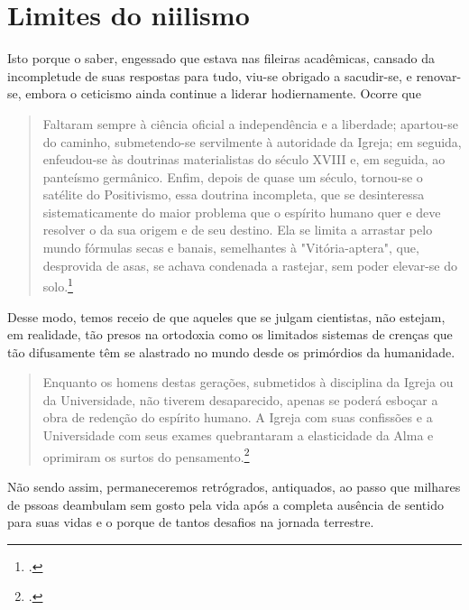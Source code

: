 \lipsum[1-5]


\chapter{Limites do niilismo}


\lipsum[1-5]

Isto porque o saber, engessado que estava nas fileiras acadêmicas, cansado da incompletude de suas respostas para tudo, viu-se obrigado a sacudir-se, e renovar-se, embora o ceticismo ainda continue a liderar hodiernamente. Ocorre que

\begin{quote}
	Faltaram sempre à ciência oficial a independência e a liberdade; apartou-se do caminho, submetendo-se servilmente à autoridade da Igreja; em seguida, enfeudou-se às doutrinas materialistas do século XVIII e, em seguida, ao panteísmo germânico. Enfim, depois de quase um século, tornou-se o satélite do Positivismo, essa doutrina incompleta, que se desinteressa sistematicamente do maior problema que o espírito humano quer e deve resolver o da sua origem e de seu destino. Ela se limita a arrastar pelo mundo fórmulas secas e banais, semelhantes à "Vitória-aptera", que, desprovida de asas, se achava condenada a rastejar, sem poder elevar-se do solo.\footcite[p.112]{denis2008}
\end{quote}

Desse modo, temos receio de que aqueles que se julgam cientistas, não estejam, em realidade, tão presos na ortodoxia como os limitados sistemas de crenças que tão difusamente têm se alastrado no mundo desde os primórdios da humanidade.

\begin{quote}
	Enquanto os homens destas gerações, submetidos à disciplina da Igreja ou da Universidade, não tiverem desaparecido, apenas se poderá esboçar a obra de redenção do espírito humano. A Igreja com suas confissões e a Universidade com seus exames quebrantaram a elasticidade da Alma e oprimiram os surtos do pensamento.\footcite[p. 114]{denis2008}
\end{quote}

Não sendo assim, permaneceremos retrógrados, antiquados, ao passo que milhares de pssoas deambulam sem gosto pela vida após a completa ausência de sentido para suas vidas e o porque de tantos desafios na jornada terrestre.

\lipsum[1-5]



